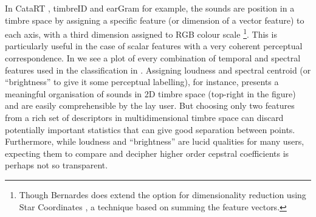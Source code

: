 In CataRT \citep{Schwarz2006a}, timbreID \cite{Brent2010} and earGram \citep{Bernardes2013} for example, the sounds are position in a timbre space by assigning a specific feature (or dimension of a vector feature) to each axis, with a third dimension assigned to RGB colour scale \footnote{Though Bernardes does extend the option for  dimensionality reduction using Star Coordinates \citep{Cooprider2007}, a technique based on summing the feature vectors.}. This is particularly useful in the case of scalar features with a very coherent perceptual correspondence.  In  we see a plot of every combination of temporal and spectral features used in the classification in  . Assigning loudness and spectral centroid (or ``brightness'' to give it some perceptual labelling), for instance, presents a meaningful organisation of sounds in 2D timbre space (top-right in the figure) and are easily comprehensible by the lay user. But choosing only two features from a rich set of descriptors in multidimensional timbre space can discard potentially important statistics that can give good separation between points. Furthermore, while loudness and ``brightness'' are lucid qualities for many users, expecting them to compare and decipher higher order cepstral coefficients is perhaps not so transparent.


